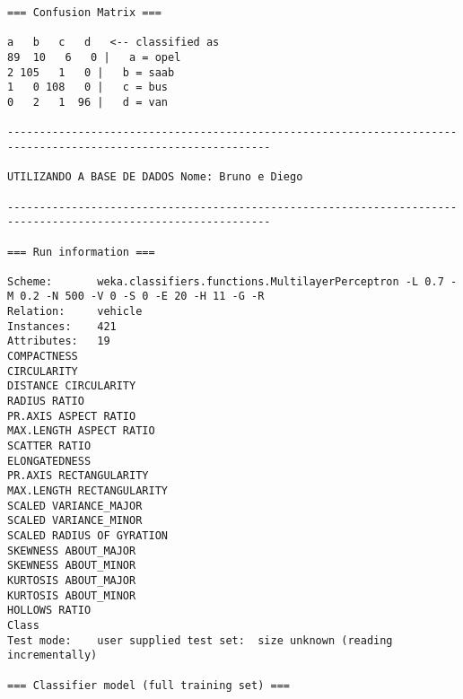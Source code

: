\documentclass[
	article,			%
	11pt,				%
	oneside,			%
	a4paper,			%
	english,			%
	brazil,				%
	sumario=tradicional
	]{abntex2}
\begin{document}
\begin{lstlisting}
=== Confusion Matrix ===

a   b   c   d   <-- classified as
89  10   6   0 |   a = opel
2 105   1   0 |   b = saab
1   0 108   0 |   c = bus
0   2   1  96 |   d = van

---------------------------------------------------------------------------------------------------------------

UTILIZANDO A BASE DE DADOS Nome: Bruno e Diego

---------------------------------------------------------------------------------------------------------------

=== Run information ===

Scheme:       weka.classifiers.functions.MultilayerPerceptron -L 0.7 -M 0.2 -N 500 -V 0 -S 0 -E 20 -H 11 -G -R
Relation:     vehicle
Instances:    421
Attributes:   19
COMPACTNESS
CIRCULARITY
DISTANCE CIRCULARITY
RADIUS RATIO
PR.AXIS ASPECT RATIO
MAX.LENGTH ASPECT RATIO
SCATTER RATIO
ELONGATEDNESS
PR.AXIS RECTANGULARITY
MAX.LENGTH RECTANGULARITY
SCALED VARIANCE_MAJOR
SCALED VARIANCE_MINOR
SCALED RADIUS OF GYRATION
SKEWNESS ABOUT_MAJOR
SKEWNESS ABOUT_MINOR
KURTOSIS ABOUT_MAJOR
KURTOSIS ABOUT_MINOR
HOLLOWS RATIO
Class
Test mode:    user supplied test set:  size unknown (reading incrementally)

=== Classifier model (full training set) ===


\end{lstlisting}
\end{document}
